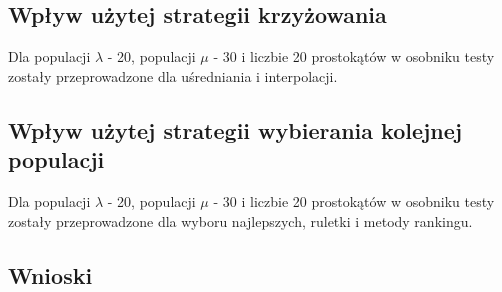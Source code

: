 \subsection*{Wpływ użytej strategii krzyżowania}
Dla populacji $\lambda$ - 20, populacji $\mu$ - 30 i liczbie 20 prostokątów w osobniku testy zostały przeprowadzone dla uśredniania i interpolacji.
\subsection*{Wpływ użytej strategii wybierania kolejnej populacji}
Dla populacji $\lambda$ - 20, populacji $\mu$ - 30 i liczbie 20 prostokątów w osobniku testy zostały przeprowadzone dla wyboru najlepszych, ruletki i metody rankingu.
\subsection{Wnioski}